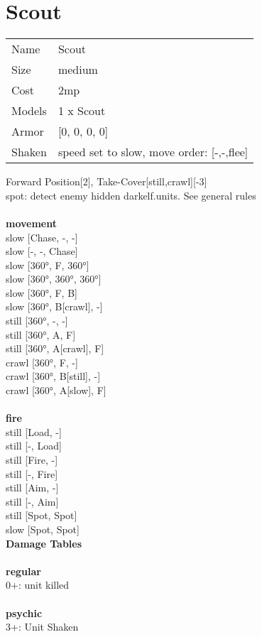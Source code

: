 \section{ Scout }

\begin{tabular}{ll}
  Name & Scout \\
  Size & medium\\
  Cost & 2mp\\
  Models & 1 x Scout\\
  Armor & [0, 0, 0, 0]\\
  Shaken & speed set to slow, move order: [-,-,flee]\\
\end{tabular}

\noindent Forward Position[2], Take-Cover[still,crawl][-3]\\ 
spot: detect enemy hidden darkelf.units. See general rules\\ 


\ \\ {\bf movement } \\
slow [Chase, -, -] \\
slow [-, -, Chase] \\
slow [360°, F, 360°] \\
slow [360°, 360°, 360°] \\
slow [360°, F, B] \\
slow [360°, B[crawl], -] \\
still [360°, -, -] \\
still [360°, A, F] \\
still [360°, A[crawl], F] \\
crawl [360°, F, -] \\
crawl [360°, B[still], -] \\
crawl [360°, A[slow], F] \\
\ \\ {\bf fire } \\
still [Load, -] \\
still [-, Load] \\
still [Fire, -] \\
still [-, Fire] \\
still [Aim, -] \\
still [-, Aim] \\
still [Spot, Spot] \\
slow [Spot, Spot] \\


{\bf Damage Tables} \\
\ \\ {\bf regular } \\
0+: unit killed \\
\ \\ {\bf psychic } \\
3+: Unit Shaken \\


